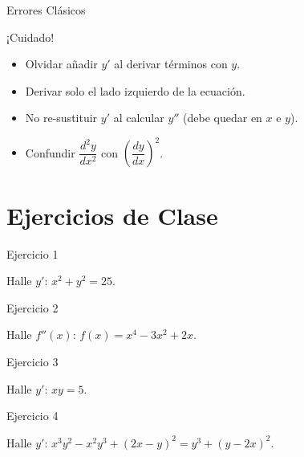 \documentclass[aspectratio=169]{beamer}
\begin{document}
\begin{frame}{Errores Clásicos}
  \begin{alertblock}{¡Cuidado!}
    \begin{itemize}
      \item Olvidar añadir $y'$ al derivar términos con $y$.
      \item Derivar solo el lado izquierdo de la ecuación.
      \item No re-sustituir $y'$ al calcular $y''$ (debe quedar en $x$ e $y$).
      \item Confundir $\dfrac{d^2y}{dx^2}$ con $\left(\dfrac{dy}{dx}\right)^2$.
    \end{itemize}
  \end{alertblock}
\end{frame}

\section{Ejercicios de Clase}

\begin{frame}{Ejercicio 1}
  \begin{mwejercicio}
    Halle $y'$: $x^2 + y^2 = 25$.
  \end{mwejercicio}
\end{frame}

\begin{frame}{Ejercicio 2}
  \begin{mwejercicio}
    Halle $f''(x)$: $f(x) = x^4 - 3x^2 + 2x$.
  \end{mwejercicio}
\end{frame}

\begin{frame}{Ejercicio 3}
  \begin{mwejercicio}
    Halle $y'$: $xy = 5$.
  \end{mwejercicio}
\end{frame}

\begin{frame}{Ejercicio 4}
  \begin{mwejercicio}
    Halle $y'$: $x^3 y^2 - x^2 y^3 + (2x-y)^2 = y^3 + (y-2x)^2$.
  \end{mwejercicio}
\end{frame}
\end{document}
